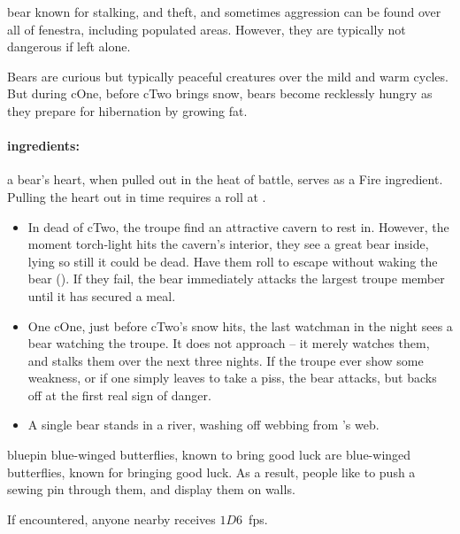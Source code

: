 \begin{multicols}{2}
  {bear}%
  {known for stalking, and theft, and sometimes aggression}%
can be found over all of \gls{fenestra}, including populated areas.
However, they are typically not dangerous if left alone.

\bear

\showEnc
Bears are curious but typically peaceful creatures over the mild and warm \glspl{cycle}.
But during \gls{cOne}, before \gls{cTwo} brings snow, bears become recklessly hungry as they prepare for hibernation by growing fat.

\paragraph{\Glspl{ingredient}:}
a bear's heart, when pulled out in the heat of battle, serves as a Fire \gls{ingredient}.
Pulling the heart out in time requires a  roll at \tn[10].

\begin{itemize}
  \item
  In dead of \gls{cTwo}, the troupe find an attractive cavern to rest in.
  However, the moment torch-light hits the cavern's interior, they see a great bear inside, lying so still it could be dead.
  Have them roll  to escape without waking the bear (\tn[8]).
  If they fail, the bear immediately attacks the largest troupe member until it has secured a meal.
  \item
  One \gls{cOne}, just before \gls{cTwo}'s snow hits, the last watchman in the night sees a bear watching the troupe.
  It does not approach -- it merely watches them, and stalks them over the next three nights.
  If the troupe ever show some weakness, or if one simply leaves to take a piss, the bear attacks, but backs off at the first real sign of danger.
  \item
  A single bear stands in a river, washing off webbing from 's web.
\end{itemize}

  {bluepin}%
  {blue-winged butterflies, known to bring good luck}%
are blue-winged butterflies, known for bringing good luck.
As a result, people like to push a sewing pin through them, and display them on walls.

If encountered, anyone nearby receives $1D6$~\glspl{fp}.


\end{multicols}
